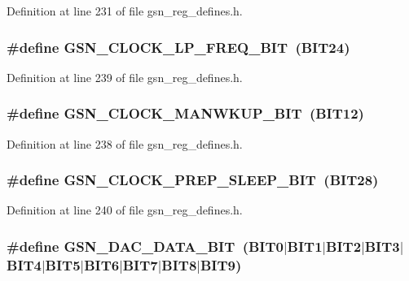 Definition at line 231 of file gsn\_\-reg\_\-defines.h.

\hypertarget{a00546_a9b7cafb9f60d107358d79d47b68a2a69}{
\subsubsection[{GSN\_\-CLOCK\_\-LP\_\-FREQ\_\-BIT}]{\setlength{\rightskip}{0pt plus 5cm}\#define GSN\_\-CLOCK\_\-LP\_\-FREQ\_\-BIT~(BIT24)}}
\label{a00546_a9b7cafb9f60d107358d79d47b68a2a69}


Definition at line 239 of file gsn\_\-reg\_\-defines.h.

\hypertarget{a00546_ad9d6d2e4125c438a32dff2d2bb92ef3b}{
\subsubsection[{GSN\_\-CLOCK\_\-MANWKUP\_\-BIT}]{\setlength{\rightskip}{0pt plus 5cm}\#define GSN\_\-CLOCK\_\-MANWKUP\_\-BIT~(BIT12)}}
\label{a00546_ad9d6d2e4125c438a32dff2d2bb92ef3b}


Definition at line 238 of file gsn\_\-reg\_\-defines.h.

\hypertarget{a00546_aa17fa9e026642ba7486c31044579b8b4}{
\subsubsection[{GSN\_\-CLOCK\_\-PREP\_\-SLEEP\_\-BIT}]{\setlength{\rightskip}{0pt plus 5cm}\#define GSN\_\-CLOCK\_\-PREP\_\-SLEEP\_\-BIT~(BIT28)}}
\label{a00546_aa17fa9e026642ba7486c31044579b8b4}


Definition at line 240 of file gsn\_\-reg\_\-defines.h.

\hypertarget{a00546_a4950e1eefe2da791fc9c23c7e3d32dc5}{
\subsubsection[{GSN\_\-DAC\_\-DATA\_\-BIT}]{\setlength{\rightskip}{0pt plus 5cm}\#define GSN\_\-DAC\_\-DATA\_\-BIT~(BIT0$|$BIT1$|$BIT2$|$BIT3$|$BIT4$|$BIT5$|$BIT6$|$BIT7$|$BIT8$|$BIT9)}}
\label{a00546_a4950e1eefe2da791fc9c23c7e3d32dc5}


